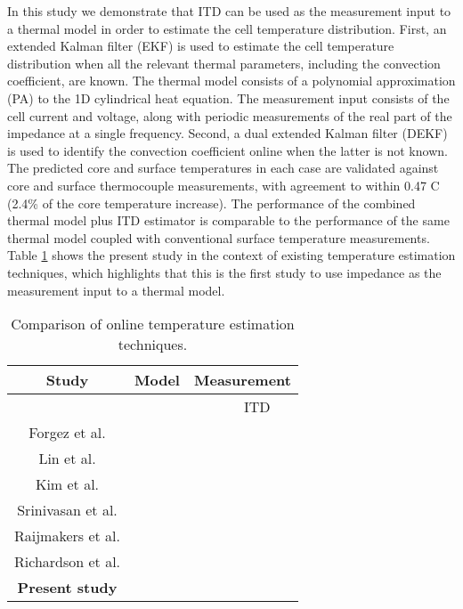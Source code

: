 \documentclass[journal, english]{IEEEtran}
\providecommand{\tabularnewline}{\\}
\begin{document}
In this study we demonstrate that ITD can be used as the measurement input
to a thermal model in order to estimate the cell temperature distribution.
First, an extended Kalman filter (EKF) is used to estimate the cell temperature distribution when all the relevant thermal parameters, including the convection coefficient, are known. The thermal model consists of a polynomial approximation (PA) to the 1D cylindrical heat equation. The measurement input consists of the cell current and voltage, along with periodic measurements of the real part of
the impedance at a single frequency. Second, a dual extended Kalman
filter (DEKF) is used to identify the convection coefficient online
when the latter is not known. The predicted core and surface temperatures in each case are validated against core and surface thermocouple measurements, with agreement to within 0.47 C (2.4\% of the core temperature increase). The performance of the combined thermal model plus ITD estimator is comparable to
the performance of the same thermal model coupled with conventional
surface temperature measurements. Table \ref{tab:comparison of techniques}
shows the present study in the context of existing temperature estimation
techniques, which highlights that this is the first study to use impedance
as the measurement input to a thermal model.
\begin{table}[h]
\begin{centering}
\begin{tabular}{|c|c|c|c|}
\hline 
Study & Model & \multicolumn{2}{c|}{Measurement}\tabularnewline
\hline 
\hline 
 &  &  & ITD\tabularnewline
\hline 
Forgez et al. \cite{Forgez2010a} &  &  & \tabularnewline
\hline 
Lin et al. \cite{Lin2013f, Lin2014} &  &  & \tabularnewline
\hline 
Kim et al. \cite{Kim2013, Kim2014b} &  &  & \tabularnewline
\hline 
Srinivasan et al. \cite{Srinivasan2011c, Srinivasan2012a} &  &  & \tabularnewline
\hline 
Raijmakers et al. \cite{Raijmakers2014d} &  &  & \tabularnewline
\hline 
Richardson et al. \cite{Richardson2014} &  &  & \tabularnewline
\hline 
\textbf{Present study} &  &  & \tabularnewline
\hline 
\end{tabular}
\par\end{centering}
\caption{Comparison of online temperature estimation techniques.\label{tab:comparison of techniques}}
\end{table}
\end{document}
